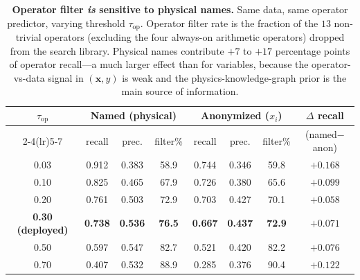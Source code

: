 \documentclass[11pt]{article}
\begin{document}
\begin{table}[h!]\centering
\caption{\textbf{Operator filter \emph{is} sensitive to physical names.}
Same data, same operator predictor, varying threshold
$\tau_{\mathrm{op}}$. Operator filter rate is the fraction of the $13$
non-trivial operators (excluding the four always-on arithmetic operators)
dropped from the search library. Physical names contribute $+7$ to $+17$
percentage points of operator recall---a much larger effect than for
variables, because the operator-vs-data signal in $(\mathbf{x},y)$ is weak and
the physics-knowledge-graph prior is the main source of information.}
\label{tab:op-sweep}
\footnotesize
\begin{tabular}{cccccccc}
\toprule
$\tau_{\mathrm{op}}$ & \multicolumn{3}{c}{Named (physical)} & \multicolumn{3}{c}{Anonymized ($x_i$)} & $\Delta$ recall \\
\cmidrule(lr){2-4}\cmidrule(lr){5-7}
 & recall & prec. & filter\% & recall & prec. & filter\% & (named$-$anon) \\
\midrule
0.03                            & 0.912 & 0.383 & 58.9 & 0.744 & 0.346 & 59.8 & $+0.168$ \\
0.10                            & 0.825 & 0.465 & 67.9 & 0.726 & 0.380 & 65.6 & $+0.099$ \\
0.20                            & 0.761 & 0.503 & 72.9 & 0.703 & 0.427 & 70.1 & $+0.058$ \\
\textbf{0.30 (deployed)}        & \textbf{0.738} & \textbf{0.536} & \textbf{76.5} & \textbf{0.667} & \textbf{0.437} & \textbf{72.9} & \textbf{$+0.071$} \\
0.50                            & 0.597 & 0.547 & 82.7 & 0.521 & 0.420 & 82.2 & $+0.076$ \\
0.70                            & 0.407 & 0.532 & 88.9 & 0.285 & 0.376 & 90.4 & $+0.122$ \\
\bottomrule
\end{tabular}
\end{table}
\end{document}
